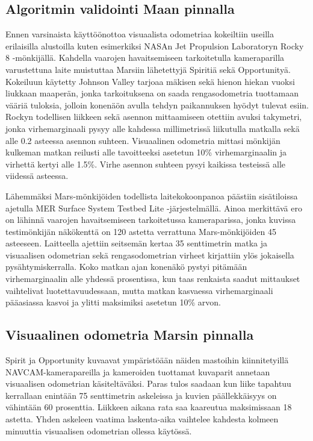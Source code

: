 \documentclass[finnish]{tktltiki2}
\theoremstyle{definition}
\theoremstyle{remark}
\begin{document}
\subsection{Algoritmin validointi Maan pinnalla}
Ennen varsinaista käyttöönottoa visuaalista odometriaa kokeiltiin useilla erilaisilla alustoilla kuten esimerkiksi NASAn Jet Propulsion Laboratoryn Rocky 8 -mönkijällä. Kahdella vaarojen havaitsemiseen tarkoitetulla kameraparilla varustettuna laite muistuttaa Marsiin lähetettyjä Spiritiä sekä Opportunityä. Kokeiluun käytetty Johnson Valley tarjoaa mäkisen sekä hienon hiekan vuoksi liukkaan maaperän, jonka tarkoituksena on saada rengasodometria tuottamaan vääriä tuloksia, jolloin konenäön avulla tehdyn paikannuksen hyödyt tulevat esiin. Rockyn todellisen liikkeen sekä asennon mittaamiseen otettiin avuksi takymetri, jonka virhemarginaali pysyy alle kahdessa millimetrissä liikutulla matkalla sekä alle 0.2 asteessa asennon suhteen. Visuaalinen odometria mittasi mönkijän kulkeman matkan reilusti alle tavoitteeksi asetetun 10\% virhemarginaalin ja virhettä kertyi alle 1.5\%. Virhe asennon suhteen pysyi kaikissa testeissä alle viidessä asteessa.

Lähemmäksi Mars-mönkijöiden todellista laitekokoonpanoa päästiin sisätiloissa ajetulla MER Surface System Testbed Lite -järjestelmällä. Ainoa merkittävä ero on lähinnä vaarojen havaitsemiseen tarkoitetussa kameraparissa, jonka kuvissa testimönkijän näkökenttä on 120 astetta verrattuna Mars-mönkijöiden 45 asteeseen. Laitteella ajettiin seitsemän kertaa 35 senttimetrin matka ja visuaalisen odometrian sekä rengasodometrian virheet kirjattiin ylös jokaisella pysähtymiskerralla. Koko matkan ajan konenäkö pystyi pitämään virhemarginaalin alle yhdessä prosentissa, kun taas renkaista saadut mittaukset vaihtelivat luotettavuudessaan, mutta matkan kasvaessa virhemarginaali pääasiassa kasvoi ja ylitti maksimiksi asetetun 10\% arvon. \cite{cheng2005visual}

\subsection{Visuaalinen odometria Marsin pinnalla}
Spirit ja Opportunity kuvaavat ympäristöään näiden mastoihin kiinnitetyillä NAVCAM-kamerapareilla ja kameroiden tuottamat kuvaparit annetaan visuaalisen odometrian käsiteltäväksi. Paras tulos saadaan kun liike tapahtuu kerrallaan enintään 75 senttimetrin askeleissa ja kuvien päällekkäisyys on vähintään 60 prosenttia. Liikkeen aikana rata saa kaareutua maksimissaan 18 astetta. Yhden askeleen vaatima laskenta-aika vaihtelee kahdesta kolmeen minuuttia visuaalisen odometrian ollessa käytössä.
\end{document}
